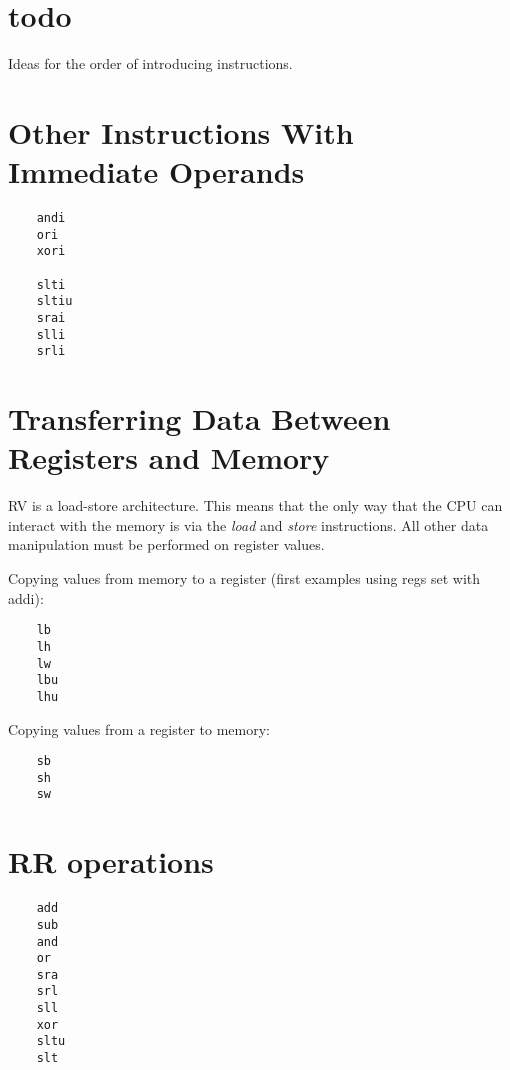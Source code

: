 \section{todo}

Ideas for the order of introducing instructions.


\section{Other Instructions With Immediate Operands}

\label{uguide:andi}
\label{uguide:ori}
\label{uguide:xori}
\label{uguide:slti}
\label{uguide:sltiu}
\label{uguide:srai}
\label{uguide:slli}
\label{uguide:srli}
{\small
\begin{verbatim}
    andi
    ori
    xori

    slti
    sltiu
    srai
    slli
    srli
\end{verbatim}
}

\section{Transferring Data Between Registers and Memory}

RV is a load-store architecture.  This means that the only way that the
CPU can interact with the memory is via the {\em load} and {\em store}
instructions.  All other data manipulation must be performed on register
values.

Copying values from memory to a register (first examples using regs set with addi):
\label{uguide:lb}
\label{uguide:lh}
\label{uguide:lw}
\label{uguide:lbu}
\label{uguide:lhu}
{\small
\begin{verbatim}
    lb
    lh
    lw
    lbu
    lhu
\end{verbatim}
}

Copying values from a register to memory:
\label{uguide:sb}
\label{uguide:sh}
\label{uguide:sw}
{\small
\begin{verbatim}
    sb
    sh
    sw
\end{verbatim}
}

\section{RR operations}
\label{uguide:add}
\label{uguide:sub}
\label{uguide:and}
\label{uguide:or}
\label{uguide:sra}
\label{uguide:srl}
\label{uguide:sll}
\label{uguide:xor}
\label{uguide:sltu}
\label{uguide:slt}
{\small
\begin{verbatim}
    add
    sub
    and
    or
    sra
    srl
    sll
    xor
    sltu
    slt
\end{verbatim}
}


